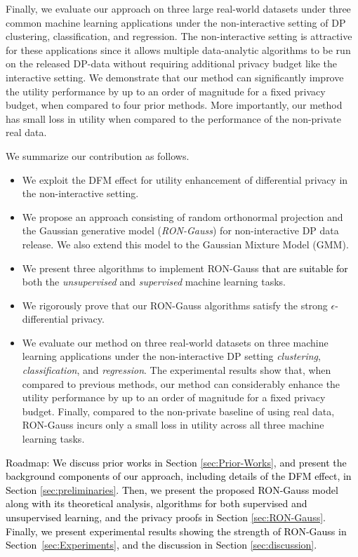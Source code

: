 \documentclass[USenglish,oneside,twocolumn]{article}
\theoremstyle{definition}
\theoremstyle{remark}
\theoremstyle{plain}
\theoremstyle{plain}
\newcommand{\chang}{\textcolor{black}}
\begin{document}
Finally, we evaluate our approach on three large real-world datasets
under three common machine learning applications under the non-interactive setting of DP \textendash{} clustering,
classification, and regression. The non-interactive setting is attractive for these applications since it allows multiple data-analytic algorithms to be run on the released DP-data without requiring additional privacy budget like the interactive setting. We demonstrate that our method can
significantly improve the utility performance by up to an order of magnitude
for a fixed privacy budget, when compared to four prior methods. More
importantly, our method has small loss in utility when compared to
the performance of the non-private real data.

We summarize our contribution as follows. 
\begin{itemize}
\item We exploit the DFM effect for utility enhancement of differential privacy in the non-interactive setting.
\item We propose an approach consisting of random orthonormal projection
and the Gaussian generative model (\emph{RON-Gauss}) for non-interactive
DP data release. We also extend this model to the Gaussian Mixture
Model (GMM).
\item We present three algorithms to implement RON-Gauss \chang{that are suitable for} both
the \emph{unsupervised} and \emph{supervised} machine learning tasks.
\item We rigorously prove that our RON-Gauss algorithms satisfy the strong
$\epsilon$-differential privacy.
\item We evaluate our method on three real-world datasets on three machine learning applications under the non-interactive DP setting \textendash{} \emph{clustering}, \emph{classification},
and \emph{regression}. The experimental results show that, when compared
to previous methods, our method can considerably enhance the utility
performance by up to an order of magnitude for a fixed privacy budget. Finally,
compared to the non-private baseline of using real data, RON-Gauss
incurs only a small loss in utility across all three machine learning
tasks.
\end{itemize}
\chang{Roadmap: We discuss prior works in Section \ref{sec:Prior-Works}, and present the background components of our approach, including details of the DFM effect, in Section \ref{sec:preliminaries}. Then, we present the proposed RON-Gauss model \textendash{} along with its theoretical analysis, algorithms for both supervised and unsupervised learning, and the privacy proofs \textendash{} in Section \ref{sec:RON-Gauss}. Finally, we present  experimental results showing the strength of RON-Gauss in Section~\ref{sec:Experiments}, and 
the discussion in Section \ref{sec:discussion}.
}
\end{document}
